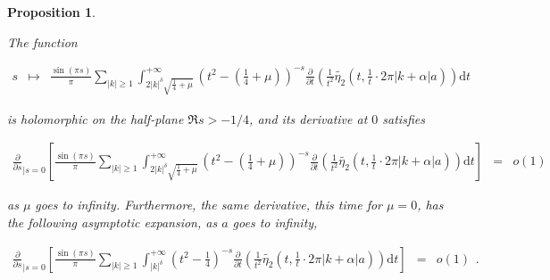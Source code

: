 \documentclass{jams-l}
\newtheorem{proposition}[theorem]{Proposition}
\theoremstyle{definition}
\theoremstyle{remark}
\numberwithin{equation}{section}
\begin{document}
                \begin{proposition}
                \label{PropMTilde1}
                
                    The function
                    
                    \[ \begin{array}{lll}
                            s & \longmapsto & \frac{\sin \left( \pi s \right)}{\pi} \sum\limits_{\left \vert k \right \vert \geqslant 1} \int_{2 \left \vert k \right \vert^{\delta} \sqrt{\frac{1}{4} + \mu}}^{+ \infty} \left( t^2 - \left( \frac{1}{4} + \mu \right) \right)^{-s} \frac{\partial}{\partial t} \left( \frac{1}{t^2} \widetilde{\eta_2} \left( t, \frac{1}{t} \cdot 2 \pi \left \vert k + \alpha \right \vert a \right) \right) \mathrm{d}t
                        \end{array} \]
                    
                    \noindent is holomorphic on the half-plane $\Re s > -1/4$, and its derivative at $0$ satisfies
                    
                    \[ \begin{array}{lll}
                            \scriptstyle \frac{\partial}{\partial s}_{\left \vert s = 0 \right.} \left[ \frac{\sin \left( \pi s \right)}{\pi} \sum\limits_{\left \vert k \right \vert \geqslant 1} \int_{2 \left \vert k \right \vert^{\delta} \sqrt{\frac{1}{4} + \mu}}^{+ \infty} \left( t^2 - \left( \frac{1}{4} + \mu \right) \right)^{-s} \frac{\partial}{\partial t} \left( \frac{1}{t^2} \widetilde{\eta_2} \left( t, \frac{1}{t} \cdot 2 \pi \left \vert k + \alpha \right \vert a \right) \right) \mathrm{d}t \right] & \scriptstyle = & \scriptstyle o \left( 1 \right)
                        \end{array} \]
                    
                    \noindent as $\mu$ goes to infinity. Furthermore, the same derivative, this time for $\mu = 0$, has the following asymptotic expansion, as $a$ goes to infinity,
                    
                    \[ \begin{array}{lll}
                            \scriptstyle \frac{\partial}{\partial s}_{\left \vert s = 0 \right.} \left[ \frac{\sin \left( \pi s \right)}{\pi} \sum\limits_{\left \vert k \right \vert \geqslant 1} \int_{\left \vert k \right \vert^{\delta}}^{+ \infty} \left( t^2 - \frac{1}{4} \right)^{-s} \frac{\partial}{\partial t} \left( \frac{1}{t^2} \widetilde{\eta_2} \left( t, \frac{1}{t} \cdot 2 \pi \left \vert k + \alpha \right \vert a \right) \right) \mathrm{d}t \right] & \scriptstyle = & \scriptstyle o \left( 1 \right)
                        \end{array} . \]
                
                \end{proposition}
                
\end{document}
